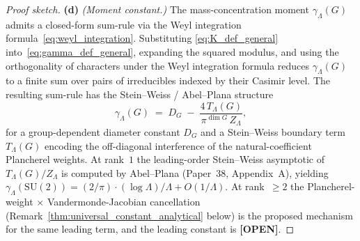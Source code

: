 \documentclass[11pt,a4paper]{article}
\theoremstyle{plain}
\theoremstyle{definition}
\newcommand{\Lammax}{\Lambda}
\newcommand{\SU}{\mathrm{SU}}
\begin{document}
\begin{proof}[Proof sketch]
\textbf{(d)} \emph{(Moment constant.)} The mass-concentration moment
$\gamma_\Lammax(G)$ admits a closed-form sum-rule via the Weyl
integration formula~\eqref{eq:weyl_integration}. Substituting
\eqref{eq:K_def_general} into~\eqref{eq:gamma_def_general}, expanding
the squared modulus, and using the orthogonality of characters under
the Weyl integration formula reduces $\gamma_\Lammax(G)$ to a finite
sum over pairs of irreducibles indexed by their Casimir level. The
resulting sum-rule has the Stein--Weiss / Abel--Plana
structure
\begin{equation}\label{eq:gamma_sum_rule_general}
   \gamma_\Lammax(G)
   \;=\; D_G \;-\; \frac{4\,T_\Lammax(G)}{\pi^{\dim G}\, Z_\Lammax},
\end{equation}
for a group-dependent diameter constant $D_G$ and a Stein--Weiss
boundary term $T_\Lammax(G)$ encoding the off-diagonal interference
of the natural-coefficient Plancherel weights. At rank~$1$ the
leading-order Stein--Weiss asymptotic of $T_\Lammax(G)/Z_\Lammax$ is
computed by Abel--Plana (Paper~38, Appendix~A), yielding
$\gamma_\Lammax(\SU(2)) = (2/\pi) \cdot (\log \Lammax)/\Lammax +
O(1/\Lammax)$. At rank~$\ge 2$ the
Plancherel-weight $\times$ Vandermonde-Jacobian cancellation
(Remark~\ref{thm:universal_constant_analytical} below) is the proposed
mechanism for the same leading term, and the leading constant is
\textbf{[OPEN]}.
\end{proof}
\end{document}
